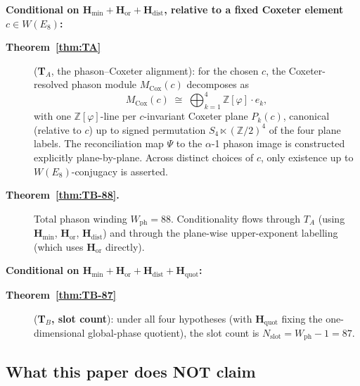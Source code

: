 \documentclass[11pt, a4paper]{amsart}
\theoremstyle{definition}
\newcommand{\Z}{\mathbb{Z}}
\newcommand{\Hmin}{\mathbf{H}_{\min}}
\newcommand{\Hor}{\mathbf{H}_{\mathrm{or}}}
\newcommand{\Hdist}{\mathbf{H}_{\mathrm{dist}}}
\newcommand{\Hquot}{\mathbf{H}_{\mathrm{quot}}}
\newcommand{\Ophi}{\mathbb{Z}[\varphi]}
\newcommand{\Mcox}{M_{\mathrm{Cox}}}
\newcommand{\Wph}{W_{\mathrm{ph}}}
\newcommand{\Nslot}{N_{\mathrm{slot}}}
\begin{document}
\textbf{Conditional on $\Hmin + \Hor + \Hdist$, relative to
a fixed Coxeter element $c \in W(E_8)$:}
\begin{description}
\item[\textbf{Theorem~\ref{thm:TA}}] (\textbf{T${}_A$}, the
  phason--Coxeter alignment): for the chosen $c$, the
  Coxeter-resolved phason module $\Mcox(c)$ decomposes as
  \[
    \Mcox(c) \;\cong\; \bigoplus_{k=1}^{4} \Ophi \cdot e_k,
  \]
  with one $\Ophi$-line per $c$-invariant Coxeter plane
  $P_k(c)$, canonical (relative to $c$) up to signed
  permutation $S_4 \ltimes (\Z/2)^4$ of the four plane
  labels. The reconciliation map $\Psi$ to the $\alpha$-1
  phason image is constructed explicitly plane-by-plane.
  Across distinct choices of $c$, only existence up to
  $W(E_8)$-conjugacy is asserted.
\item[\textbf{Theorem~\ref{thm:TB-88}.}] Total phason
  winding $\Wph = 88$. Conditionality flows through $T_A$
  (using $\Hmin$, $\Hor$, $\Hdist$) and through the
  plane-wise upper-exponent labelling (which uses $\Hor$
  directly).
\end{description}

\textbf{Conditional on $\Hmin + \Hor + \Hdist + \Hquot$:}
\begin{description}
\item[\textbf{Theorem~\ref{thm:TB-87}}] (\textbf{T${}_B$,
  slot count}): under all four hypotheses (with $\Hquot$
  fixing the one-dimensional global-phase quotient), the
  slot count is $\Nslot = \Wph - 1 = 87$.
\end{description}

\subsection{What this paper does NOT claim}
\end{document}

